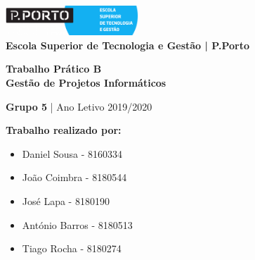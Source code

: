 \documentclass[12pt]{article}
\begin{document}
\graphicspath{ {media/} }
\begin{titlepage}

\center

\includegraphics[width=5cm]{estg.png}\\[1cm]
\textbf{Escola Superior de Tecnologia e Gestão | P.Porto}\\[0.5cm]

\vfill

\linespread{1.2}\huge {\bfseries Trabalho Prático B}\\[0.5cm]
\large{\textbf{Gestão de Projetos Informáticos}}

\normalsize{\textbf{Grupo 5} | Ano Letivo 2019/2020}

\vfill

\endcenter

\begin{flushleft}
\textbf{\small Trabalho realizado por:}\\[0cm]

\begin{itemize}
	\item{\small Daniel Sousa - 8160334}\\[0cm]
	\item{\small João Coimbra - 8180544}\\[0cm]
	\item{\small José Lapa - 8180190}\\[0cm]
	\item{\small António Barros - 8180513}\\[0cm]
	\item{\small Tiago Rocha - 8180274}

\end{itemize}

\end{flushleft}

\end{titlepage}
\pagestyle{fancy}
\fancyhf{}

\newpage
{}
\tableofcontents
\newpage
\listoffigures
\newpage
\listoftables
\newpage
{}

\newpage

\medskip
\end{document}

